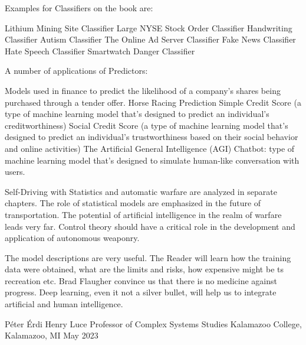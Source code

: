 Examples for Classifiers on the book are:

Lithium Mining Site Classifier
Large NYSE Stock Order Classifier 
Handwriting Classifier 
Autism Classifier
The Online Ad Server Classifier 
Fake News Classifier
Hate Speech Classifier
Smartwatch Danger Classifier 
 
A number of applications of Predictors:

Models used in finance to predict the likelihood of a company’s shares being purchased through a tender offer.
Horse Racing Prediction
Simple Credit Score  (a type of machine learning model that’s designed to predict an individual’s creditworthiness)
Social Credit Score (a type of machine learning
model that’s designed to predict an individual’s trustworthiness
based on their social behavior and online activities)
The Artificial General Intelligence (AGI) Chatbot: type of machine learning model that’s designed to simulate human-like conversation with users. 

Self-Driving with Statistics and automatic warfare are analyzed in separate chapters. The role of statistical models are emphasized in the future of transportation. The potential of artificial intelligence in the realm of warfare leads very far. Control theory should have a critical role in the development and application of autonomous weaponry.

The model descriptions are very useful. The Reader will learn how the training data were obtained, what are the limits and risks, how expensive might be ts recreation etc. Brad Flaugher convince us that there is no medicine  against progress. Deep learning, even it not a silver bullet, will help us to integrate artificial and human intelligence.

Péter Érdi
Henry Luce Professor of Complex Systems Studies
Kalamazoo College,
Kalamazoo, MI 
                                                              May 2023






